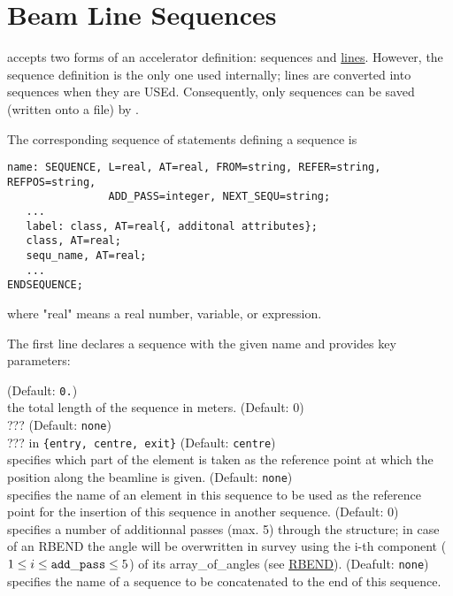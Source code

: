 
\chapter{Beam Line Sequences}
\label{chap:sequence}
\madx accepts two forms of an accelerator definition: sequences and
\href{line.html}{lines}. However, the sequence definition is the only
one used internally; lines are converted into sequences when they are
USEd. Consequently, only sequences can be saved (written onto a file)
by \madx.  

The corresponding sequence of statements defining a sequence is 
\begin{verbatim}
name: SEQUENCE, L=real, AT=real, FROM=string, REFER=string, REFPOS=string, 
                ADD_PASS=integer, NEXT_SEQU=string;
   ...
   label: class, AT=real{, additonal attributes}; 
   class, AT=real;
   sequ_name, AT=real;
   ...
ENDSEQUENCE;
\end{verbatim} 
where "real" means a real number, variable, or expression. 

The first line declares a sequence with the given name and provides key 
parameters:
\begin{madlist}
    (Default: {\tt 0.})\\
     the total length of the sequence in meters. 
    (Default: 0)\\
     ???
    (Default: {\tt none})\\
     ???
    in {\tt \{entry, centre, exit\}} (Default:
          {\tt centre}) \\
     specifies which part of the element is taken as the reference point 
     at which the position along the beamline is given.
    (Default: {\tt none})\\
   specifies the name of an element in this sequence to be used as the
   reference point for the insertion of this sequence in another
   sequence.  
    (Default: 0)\\ 
     specifies a number of additionnal passes (max. 5) through the
     structure; in case of an RBEND the angle will be overwritten in  survey
     using the i-th component ($1 \le i \le {\tt add\_pass} \le 5$) of
     its array\_of\_angles (see \href{bend.html}{RBEND}). 
    (Deafult: {\tt none})\\
     specifies the name of a sequence to be concatenated 
     to the end of this sequence. 
\end{madlist}
 

